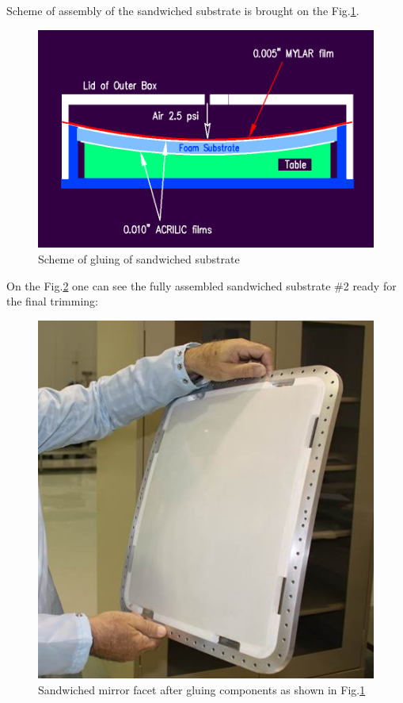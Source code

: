 \indent Scheme of assembly of the sandwiched substrate is brought on the Fig.\ref{fig:Gluing_Sandwich}.
\begin{figure}[h]
    \centering
    \includegraphics[width=0.9\linewidth]{Gluing_Sandwich_New.png}
    \caption{Scheme of gluing of sandwiched substrate}
    \label{fig:Gluing_Sandwich}
\end{figure}{}

On the Fig.\ref{fig:Assembled_Sandwich} one can see the fully assembled sandwiched substrate \#2 ready for the final trimming: 
\begin{figure}[h]
    \centering
    \includegraphics[width=0.9\linewidth]{Assembled_Sandwich.jpg}
    \caption{Sandwiched mirror facet after gluing components as shown in Fig.\ref{fig:Gluing_Sandwich}}
    \label{fig:Assembled_Sandwich}
\end{figure}{}

